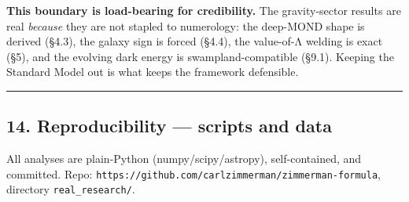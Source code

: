\documentclass[
]{article}
\begin{document}
\textbf{This boundary is load-bearing for credibility.} The
gravity-sector results are real \emph{because} they are not stapled to
numerology: the deep-MOND shape is derived (§4.3), the galaxy sign is
forced (§4.4), the value-of-Λ welding is exact (§5), and the evolving
dark energy is swampland-compatible (§9.1). Keeping the Standard Model
out is what keeps the framework defensible.

\begin{center}\rule{0.5\linewidth}{0.5pt}\end{center}

\subsection{14. Reproducibility --- scripts and
data}\label{reproducibility-scripts-and-data}

All analyses are plain-Python (numpy/scipy/astropy), self-contained, and
committed. Repo:
\texttt{https://github.com/carlzimmerman/zimmerman-formula}, directory
\texttt{real\_research/}.
\end{document}
